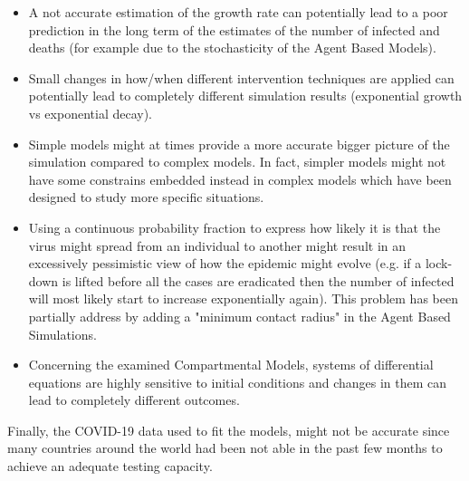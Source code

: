 \begin{itemize}
    \item A not accurate estimation of the growth rate can potentially lead to a poor prediction in the long term of the estimates of the number of infected and deaths (for example due to the stochasticity of the Agent Based Models).
    \item Small changes in how/when different intervention techniques are applied can potentially lead to completely different simulation results (exponential growth vs exponential decay).
    \item Simple models might at times provide a more accurate bigger picture of the simulation compared to complex models. In fact, simpler models might not have some constrains embedded instead in complex models which have been designed to study more specific situations.
    \item Using a continuous probability fraction to express how likely it is that the virus might spread from an individual to another might result in an excessively pessimistic view of how the epidemic might evolve (e.g. if a lock-down is lifted before all the cases are eradicated then the number of infected will most likely start to increase exponentially again). This problem has been partially address by adding a "minimum contact radius" in the Agent Based Simulations. 
    \item Concerning the examined Compartmental Models, systems of differential equations are highly sensitive to initial conditions and changes in them can lead to completely different outcomes.
\end{itemize}

Finally, the COVID-19 data used to fit the models, might not be accurate since many countries around the world had been not able in the past few months to achieve an adequate testing capacity.
